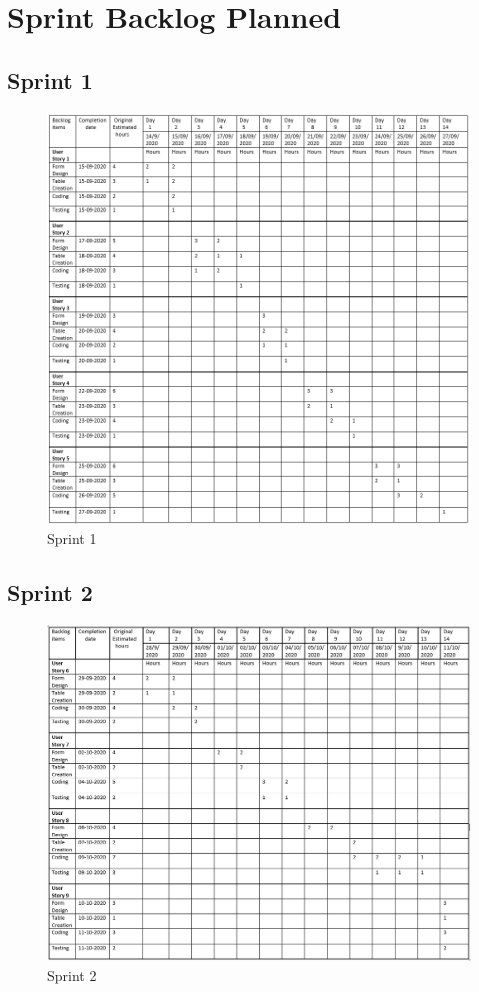 \documentclass[a4paper,12pt]{report}
\begin{document}
\section{Sprint Backlog Planned}
\subsection {Sprint 1}
\begin{figure}[bph]
	\centering
	\includegraphics[width=1\linewidth]{img/sprint/sp1PLN}
	\caption{Sprint 1}
\end{figure}
\pagebreak
\subsection {Sprint 2}
\begin{figure}[bph]
	\centering
	\includegraphics[width=1\linewidth]{img/sprint/SSPRINT2PLAN}
	\caption{Sprint 2}
\end{figure}
\pagebreak
\end{document}
